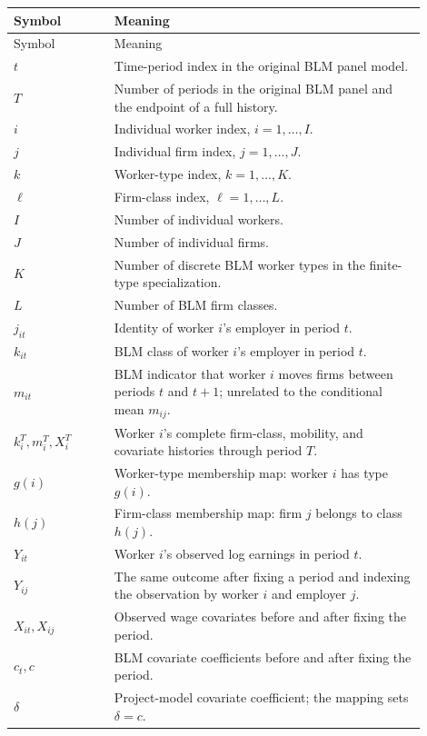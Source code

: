 \documentclass[11pt]{article}
\begin{document}
\begin{longtable}{
  >{\raggedright\arraybackslash}p{0.22\linewidth}
  >{\raggedright\arraybackslash}p{0.68\linewidth}}
\hline
Symbol & Meaning \\
\hline
\endfirsthead
\hline
Symbol & Meaning \\
\hline
\endhead
\(t\) & Time-period index in the original BLM panel model. \\
\(T\) & Number of periods in the original BLM panel and the endpoint of a full history. \\
\(i\) & Individual worker index, \(i=1,\ldots,I\). \\
\(j\) & Individual firm index, \(j=1,\ldots,J\). \\
\(k\) & Worker-type index, \(k=1,\ldots,K\). \\
\(\ell\) & Firm-class index, \(\ell=1,\ldots,L\). \\
\(I\) & Number of individual workers. \\
\(J\) & Number of individual firms. \\
\(K\) & Number of discrete BLM worker types in the finite-type specialization. \\
\(L\) & Number of BLM firm classes. \\
\(j_{it}\) & Identity of worker \(i\)'s employer in period \(t\). \\
\(k_{it}\) & BLM class of worker \(i\)'s employer in period \(t\). \\
\(m_{it}\) & BLM indicator that worker \(i\) moves firms between periods \(t\) and \(t+1\); unrelated to the conditional mean \(m_{ij}\). \\
\(k_i^T,m_i^T,X_i^T\) & Worker \(i\)'s complete firm-class, mobility, and covariate histories through period \(T\). \\
\(g(i)\) & Worker-type membership map: worker \(i\) has type \(g(i)\). \\
\(h(j)\) & Firm-class membership map: firm \(j\) belongs to class \(h(j)\). \\
\(Y_{it}\) & Worker \(i\)'s observed log earnings in period \(t\). \\
\(Y_{ij}\) & The same outcome after fixing a period and indexing the observation by worker \(i\) and employer \(j\). \\
\(X_{it},X_{ij}\) & Observed wage covariates before and after fixing the period. \\
\(c_t,c\) & BLM covariate coefficients before and after fixing the period. \\
\(\delta\) & Project-model covariate coefficient; the mapping sets \(\delta=c\). \\

\end{longtable}
\end{document}
